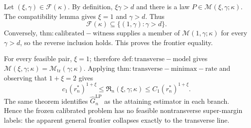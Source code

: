 Let \((\xi,\gamma)\in\mathcal F(\kappa)\). By definition, \(\xi\gamma>d\) and there is a law \(P\in\mathcal M(\xi,\gamma;\kappa)\). The compatibility lemma gives \(\xi=1\) and \(\gamma>d\). Thus
\[
\mathcal F(\kappa)\subseteq\{(1,\gamma):\gamma>d\}.
\]
Conversely, \(\mathrm{thm:calibrated-witness}\) supplies a member of \(\mathcal M(1,\gamma;\kappa)\) for every \(\gamma>d\), so the reverse inclusion holds. This proves the frontier equality.

For every feasible pair, \(\xi=1\); therefore \(\mathrm{def:transverse-model}\) gives \(\mathcal M(\xi,\gamma;\kappa)=\mathcal M_{\mathrm{tr}}(\gamma;\kappa)\). Applying \(\mathrm{thm:transverse-minimax-rate}\) and observing that \(1+\xi=2\) gives
\[
c_1(r_n^*)^{1+\xi}\le\mathfrak R_n(\xi,\gamma;\kappa)\le C_1(r_n^*)^{1+\xi}.
\]
The same theorem identifies \(\widehat G_n^{\mathrm{LP}}\) as the attaining estimator in each branch. Hence the frozen calibrated problem has no feasible nontransverse super-margin labels: the apparent general frontier collapses exactly to the transverse line.